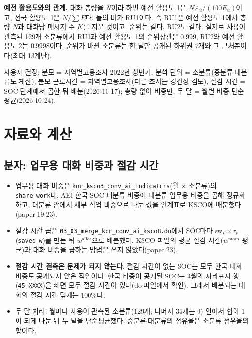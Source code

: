 \documentclass[11pt]{article}
\begin{document}
\textbf{예전 활용도와의 관계.} 대화 총량을 $N$이라 하면 예전 활용도 1은 $N A_u/(100E_u)$이고, 전국 활용도 1은 $N/\sum E$다. 둘의 비가 RU1이다. 즉 RU1은 예전 활용도 1에서 총량 $N$과 대화당 메시지 수 $K$를 지운 것이고, 순위는 같다. RU2도 같다. 실제로 사용이 관측된 129개 소분류에서 RU1과 예전 활용도 1의 순위상관은 0.999, RU2와 예전 활용도 2는 0.9998이다. 순위가 바뀐 소분류는 한 달만 공개된 하위권 7개와 그 근처뿐이다(최대 13계단).

사용자 결정: 분모 = 지역별고용조사 2022년 상반기, 분석 단위 = 소분류(중분류$\cdot$대분류도 계산), 분모 근로시간 = 지역별고용조사(다른 조사는 강건성 검토), 절감 시간 = SOC 단계에서 곱한 뒤 배분(2026-10-17); 총량 없이 비중만, 두 달 = 월별 비중 단순평균(2026-10-24).

\section{자료와 계산}

\subsection{분자: 업무용 대화 비중과 절감 시간}

\begin{itemize}[leftmargin=*]
  \item 업무용 대화 비중은 \texttt{kor\_ksco3\_conv\_ai\_indicators}(월 $\times$ 소분류)의 \texttt{share\_work}다. AEI 한국 SOC 대분류 비중에 대분류 업무용 비중을 곱해 정규화하고, 대분류 안에서 세부 직업 비중으로 나눈 값을 연계표로 KSCO에 배분했다(paper 19$\cdot$23).
  \item 절감 시간 곱은 \texttt{03\_03\_merge\_kor\_conv\_ai\_ksco8.do}에서 SOC마다 $\mathrm{sw}_s \times \tau_s$(\texttt{saved\_w})를 만든 뒤 $w^{\text{alloc}}$으로 배분했다. KSCO 파일의 평균 절감 시간($w^{\text{mean}}$ 평균)과 대화 비중을 곱하는 방법은 쓰지 않았다(paper 23).
  \item \textbf{절감 시간 결측은 문제가 되지 않는다.} 절감 시간이 없는 SOC는 모두 한국 대화 비중도 공개되지 않은 직업이다. 한국 비중이 공개된 SOC는 4월의 자리표시 행(\texttt{45-XXXX})을 빼면 모두 절감 시간이 있다(do 파일에서 확인). 그래서 배분되는 대화의 절감 시간 덮개는 100\%다.
  \item 두 달 처리: 월마다 사용이 관측된 소분류(129개; 나머지 34개는 0) 안에서 합이 1이 되게 나눈 뒤 두 달을 단순평균했다. 중분류$\cdot$대분류의 점유율은 소분류 점유율의 합이다.
\end{itemize}
\end{document}
